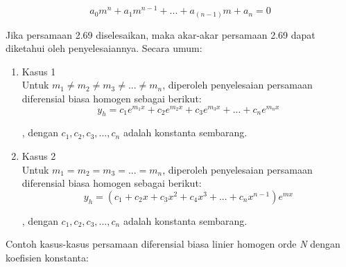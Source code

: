 \begin{equation} a_0 m^{n} + a_1 m^{n - 1} + ... + a_(n - 1) m + a_n = 0 \end{equation}

Jika persamaan 2.69 diselesaikan, maka akar-akar persamaan 2.69 dapat diketahui oleh penyelesaiannya. Secara umum:

\begin{enumerate} [1.]

	\item Kasus 1 \\

	Untuk \begin{math} m_1 \neq m_2 \neq m_3 \neq ... \neq m_n \end{math}, diperoleh penyelesaian persamaan diferensial biasa homogen sebagai berikut: \\
	
	\begin{equation} y_h = c_1 e^{m_1 x} + c_2 e^{m_2 x} + c_3 e^{m_3 x} + ... + c_n e^{m_n x} \end{equation} 

	, dengan \begin{math} c_1, c_2, c_3, ..., c_n \end{math} adalah konstanta sembarang.

	\item Kasus 2 \\
	
	Untuk \begin{math} m_1 = m_2 = m_3 = ... = m_n \end{math},  diperoleh penyelesaian persamaan diferensial biasa homogen sebagai berikut: \\
	
	\begin{equation} y_h = (c_1 + c_2 x + c_3 x^{2} + c_4 x^{3} + ... + c_n x^{n -1}) e^{mx} \end{equation}  

	, dengan \begin{math} c_1, c_2, c_3, ..., c_n \end{math} adalah konstanta sembarang.

\end{enumerate}

Contoh kasus-kasus persamaan diferensial biasa linier homogen orde \textit{N} dengan koefisien konstanta:


